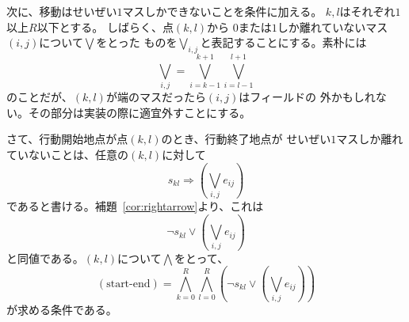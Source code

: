 次に、移動はせいぜい$1$マスしかできないことを条件に加える。
$k, l$はそれぞれ$1$以上$R$以下とする。
しばらく、点$(k, l)$から
$0$または$1$しか離れていないマス$(i, j)$について$\bigvee$をとった
ものを$\bigvee_{i, j}$と表記することにする。素朴には
\[
 \bigvee_{i, j} = \bigvee_{i = k-1}^{k+1} \bigvee_{i = l-1}^{l+1} 
\]
のことだが、$(k, l)$が端のマスだったら$(i, j)$はフィールドの
外かもしれない。その部分は実装の際に適宜外すことにする。

さて、行動開始地点が点$(k, l)$のとき、行動終了地点が
せいぜい$1$マスしか離れていないことは、任意の$(k, l)$に対して
\[
 s_{kl} \Rightarrow \left( \bigvee_{i, j} e_{ij} \right)
\]
であると書ける。補題~\ref{cor:rightarrow}より、これは
\[
 \lnot s_{kl} \lor \left( \bigvee_{i, j} e_{ij} \right)
\]
と同値である。$(k, l)$について$\bigwedge$をとって、
\[
 (\text{start-end}) = \bigwedge_{k = 0}^R \bigwedge_{l = 0}^R 
 \left(\lnot s_{kl} \lor \left( \bigvee_{i, j} e_{ij} \right) \right)
\]
が求める条件である。

